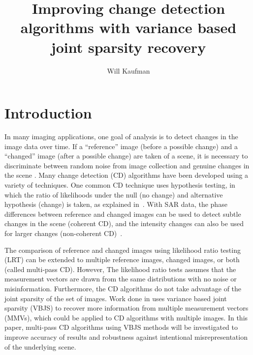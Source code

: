 \documentclass{article}
\title{Improving change detection algorithms with variance based joint sparsity recovery}
\author{Will Kaufman%
}
\begin{document}
\maketitle




\section{Introduction}

In many imaging applications, one goal of analysis is to detect changes in the image data over time. If a ``reference'' image (before a possible change) and a ``changed'' image (after a possible change) are taken of a scene, it is necessary to discriminate between random noise from image collection and genuine changes in the scene%
. Many change detection (CD) algorithms have been developed using a variety of techniques. One common CD technique uses hypothesis testing, in which the ratio of likelihoods under the null (no change) and alternative hypothesis (change) is taken, as explained in~\cite{novak_2005}. With SAR data, the phase differences between reference and changed images can be used to detect subtle changes in the scene (coherent CD), and the intensity changes can also be used for larger changes (non-coherent CD)~\cite{Ash_2014}.

The comparison of reference and changed images using likelihood ratio testing (LRT) can be extended to multiple reference images, changed images, or both (called multi-pass CD). However, The likelihood ratio tests assumes that the measurement vectors are drawn from the same distributions with no noise or misinformation. Furthermore, the CD algorithms do not take advantage of the joint sparsity of the set of images. Work done in \cite{gelb_2018} uses variance based joint sparsity (VBJS) to recover more information from multiple measurement vectors (MMVs), which could be applied to CD algorithms with multiple images. In this paper, multi-pass CD algorithms using VBJS methods will be investigated to improve accuracy of results and robustness against intentional misrepresentation of the underlying scene.
\end{document}
